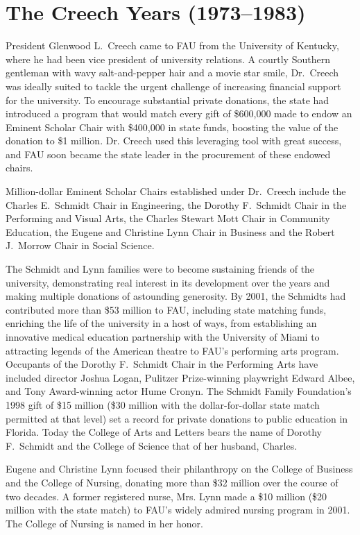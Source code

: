 \documentclass{article}
\begin{document}
\section{The Creech Years (1973--1983)}

President Glenwood L.\ Creech came to FAU from the University of Kentucky, where he had been vice president of university relations.  A courtly Southern gentleman with wavy salt-and-pepper hair and a movie star smile, Dr.\ Creech was ideally suited to tackle the urgent challenge of increasing financial support for the university.  To encourage substantial private donations, the state had introduced a program that would match every gift of \$600,000 made to endow an Eminent Scholar Chair with \$400,000 in state funds, boosting the value of the donation to \$1 million.  Dr. Creech used this leveraging tool with great success, and FAU soon became the state leader in the procurement of these endowed chairs.

Million-dollar Eminent Scholar Chairs established under Dr.\ Creech include the Charles E.\ Schmidt Chair in Engineering, the Dorothy F.\ Schmidt Chair in the Performing and Visual Arts, the Charles Stewart Mott Chair in Community Education, the Eugene and Christine Lynn Chair in Business and the Robert J.\ Morrow Chair in Social Science.

The Schmidt and Lynn families were to become sustaining friends of the university, demonstrating real interest in its development over the years and making multiple donations of astounding generosity.  By 2001, the Schmidts had contributed more than \$53 million to FAU, including state matching funds, enriching the life of the university in a host of ways, from establishing an innovative medical education partnership with the University of Miami to attracting legends of the American theatre to FAU's performing arts program.  Occupants of the Dorothy F.\ Schmidt Chair in the Performing Arts have included director Joshua Logan, Pulitzer Prize-winning playwright Edward Albee, and Tony Award-winning actor Hume Cronyn.  The Schmidt Family Foundation's 1998 gift of \$15 million (\$30 million with the dollar-for-dollar state match permitted at that level) set a record for private donations to public education in Florida.  Today the College of Arts and Letters bears the name of Dorothy F.\ Schmidt and the College of Science that of her husband, Charles.

Eugene and Christine Lynn focused their philanthropy on the College of Business and the College of Nursing, donating more than \$32 million over the course of two decades.  A former registered nurse, Mrs. Lynn made a \$10 million (\$20 million with the state match) to FAU's widely admired nursing program in 2001.  The College of Nursing is named in her honor.
\end{document}
